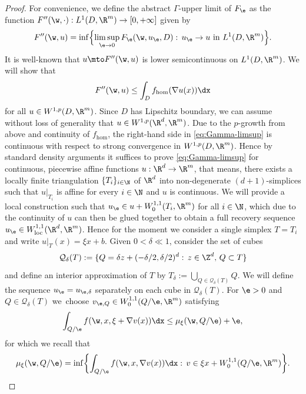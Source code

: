 \begin{proof}
For convenience, we define the abstract $\Gamma$-upper limit of $F_{\e}$ as the function $F''(\w,\cdot):L^1(D,\R^m)\to [0,+\infty]$ given by
\begin{equation*}
F''(\w,u)=\inf\Bigl\{\limsup_{\e\to 0}F_{\e}(\w,u_{\e},D):\,u_{\e}\rightarrow u\text{ in }L^1(D,\R^m)\Bigr\}.
\end{equation*}
It is well-known that $u\mto F''(\w,u)$ is lower semicontinuous on $L^1(D,\R^m)$. We will show that
\begin{equation}\label{eq:Gamma-limsup}
F''(\w,u)\leq \int_D f_{\hom}(\nabla u(x))\dx
\end{equation}
for all $u\in W^{1,p}(D,\R^m)$. Since $D$ has Lipschitz boundary, we can assume without loss of generality that $u\in W^{1,p}(\R^d,\R^m)$. Due to the $p$-growth from above and continuity of $f_{\hom}$, the right-hand side in \eqref{eq:Gamma-limsup} is continuous with respect to strong convergence in $W^{1,p}(D,\R^m)$. Hence by standard density arguments it suffices to prove \eqref{eq:Gamma-limsup} for continuous, piecewise affine functions $u:\R^d\to\R^m$, that means, there exists a locally finite triangulation $\{T_i\}_{i\in\N}$ of $\R^d$ into non-degenerate $(d+1)$-simplices such that $u|_{T_i}$ is affine for every $i\in\N$ and $u$ is continuous. We will provide a local construction such that $u_{\e}\in u+W^{1,1}_0(T_i,\R^m)$ for all $i\in\N$, which due to the continuity of $u$ can then be glued together to obtain a full recovery sequence $u_{\e}\in W^{1,1}_\mathrm{loc}(\R^d,\R^m)$. Hence for the moment we consider a single simplex $T=T_i$ and write $u|_T(x)=\xi x+b$. Given $0<\delta\ll 1$, consider the set of cubes
\begin{equation*}
\mathcal{Q}_{\delta}(T):=\{Q=\delta z+(-\delta/2,\delta/2)^d:\, z\in\Z^d,\,Q\subset T\}
\end{equation*}
and define an interior approximation of $T$ by $T_{\delta}:=\bigcup_{Q\in\mathcal{Q}_{\delta}(T)}Q$. We will define the sequence $u_{\e}=u_{\e,\delta}$ separately on each cube in $\mathcal{Q}_{\delta}(T)$. For $\e>0$ and $Q\in\mathcal{Q}_{\delta}(T)$ we~choose $v_{\e,Q}\in W^{1,1}_0(Q/\e,\R^m)$ satisfying
\begin{equation*}
\int_{Q/\e}f(\w,x,\xi+\nabla v(x))\dx\leq \mu_{\xi}(\w,Q/\e)+\e,
\end{equation*}
for which we recall that
\begin{equation*}
\mu_{\xi}(\w,Q/\e)=\inf\biggl\{\int_{Q/\e}f(\w,x,\nabla v(x))\dx:\,v\in \xi x+W_0^{1,1}(Q/\e,\R^m)\biggr\}.

\end{equation*}
\end{proof}
